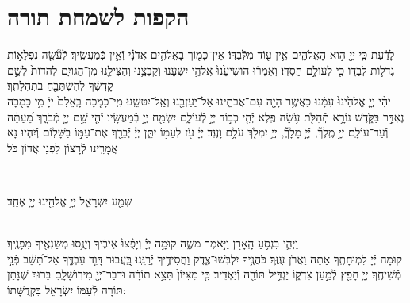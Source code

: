 \documentclass[twoside, openany, parskip=half, 11pt]{book}
\begin{document}
\chapter[הקפות לשמחת תורה]{ הקפות לשמחת תורה }


לָדַ֔עַת כִּ֥י יְיָ֖ ה֣וּא הָאֱלֹהִ֑ים אֵ֥ין ע֖וֹד מִלְּֿבַדּֽוֹ׃ \hfill \break
אֵין־כָּמ֖וֹךָ בָאֱלֹהִ֥ים אֲדֹנָ֗י וְֿאֵ֣ין כְּֽֿמַעֲשֶֽׂיךָ׃ \hfill \break
לְֿעֹ֘שֵׂ֤ה נִפְלָא֣וֹת גְּֿדֹל֣וֹת לְֿבַדּ֑וֹ כִּ֖י לְֿעוֹלָ֣ם חַסְדּֽוֹ׃ \hfill \break
וְֿאִמְר֕וּ הוֹשִׁיעֵ֙נוּ֙ אֱלֹהֵ֣י יִשְׁעֵ֔נוּ וְֿקַבְּֿצֵ֥נוּ וְֿהַצִּילֵ֖נוּ מִן־הַגּוֹיִ֑ם לְֿהֹדוֹת֙ לְֿשֵׁ֣ם קָדְֿשֶׁ֔ךָ לְֿהִשְׁתַּבֵּ֖חַ בִּתְהִלָּתֶֽךָ׃\\
יְֿהִ֨י יְֿיָ֤ אֱלֹהֵ֙ינוּ֙ עִמָּ֔נוּ כַּאֲשֶׁ֥ר הָיָ֖ה עִם־אֲבֹתֵ֑ינוּ אַל־יַעַזְבֵ֖נוּ וְֿאַֽל־יִטְּשֵֽׁנוּ׃ \hfill \break
מִֽי־כָמֹ֤כָה בָּֽאֵלִם֙ יְיָ֔ מִ֥י כָּמֹ֖כָה נֶאְדָּ֣ר בַּקֹּ֑דֶשׁ נוֹרָ֥א תְֿהִלֹּ֖ת עֹ֥שֵׂה פֶֽלֶא׃ \hfill \break
יְֿהִ֤י כְב֣וֹד יְיָ֣ לְֿעוֹלָ֑ם יִשְׂמַ֖ח יְיָ֣ בְּֿמַעֲשָֽׂיו׃ \hfill \break
יְֿהִ֤י שֵׁ֣ם יְיָ֣ מְֿבֹרָ֑ךְ מֵ֝עַתָּ֗ה וְֿעַד־עוֹלָֽם׃ \hfill \break
יְיָ֣ מֶֽלֶךְ֘, יְֿיָ֣ מָלָךְֿ֘, יְיָ֥ יִמְלֹ֖ךְ עֹלָ֥ם וָעֶֽד׃ \hfill \break
יְיָ֗ עֹ֖ז לְעַמּ֣וֹ יִתֵּ֑ן יְיָ֓ יְֿבָרֵ֖ךְ אֶת־עַמּ֣וֹ בַשָּׁלֽוֹם׃ \hfill \break
וְֿיִהְיוּ נָא אֲמָרֵֽינוּ לְֿרָצוֹן לִפְנֵי אֲדוֹן כֹּל׃ \hfill \break

\vspace{-1.3\baselineskip}

\\
\begin{large}
שְֿׁמַ֖ע יִשְׂרָאֵ֑ל יְיָ֥ אֱלֹהֵ֖ינוּ יְיָ֥ אֶחָֽד׃
\end{large}

\\
וַיְֿהִ֛י בִּנְסֹ֥עַ הָֽאָרֹ֖ן וַיֹּ֣אמֶר מֹשֶׁ֑ה קוּמָ֣ה יְיָ֗ וְֿיָפֻ֨צוּ֙ אֹֽיְֿבֶ֔יךָ וְֿיָנֻ֥סוּ מְֿשַׂנְאֶ֖יךָ מִפָּנֶֽיךָ׃\\
קוּמָה יְֿיָ לִמְוּחָתֶֽךָ אַתָה וַאֲרֹן עֻזֶּֽךָ׃ \hfill \break
כֹּהֲנֶ֥יךָ יִלְבְּשׁוּ־צֶ֑דֶק וַחֲסִידֶ֥יךָ יְֿרַנֵּֽנוּ׃ \hfill \break
בַּֽ֭עֲבוּר דָּוִ֣ד עַבְדֶּ֑ךָ אַל־תָּ֝שֵׁ֗ב פְּֿנֵ֣י מְֿשִׁיחֶֽךָ׃ \hfill \break
יְיָ֥ חָפֵ֖ץ לְֿמַ֣עַן צִדְק֑וֹ יַגְדִּ֥יל תּוֹרָ֖ה וְֿיַאְדִּֽיר׃ \hfill \break
כִּ֤י מִצִּיּוֹן֙ תֵּצֵ֣א תוֹרָ֔ה וּדְבַר־יְיָ֖ מִירֽוּשָׁלָֽםִ׃ \hfill \break
בָּרוּךְ שֶׁנָּתַן תּוֹרָה לְֿעַמּוֹ יִשְׂרָאֵל בִּקְדֻשָּׁתוֹ: \hfill \break
\end{document}
